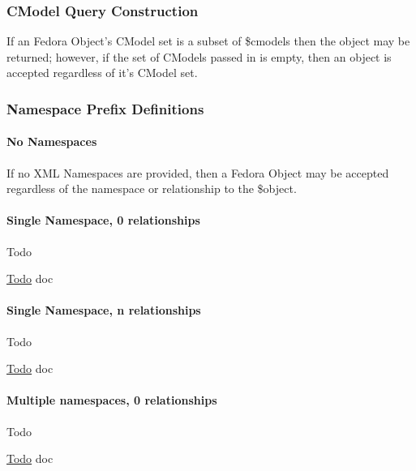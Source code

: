 \subsubsection*{C\+Model Query Construction}

If an Fedora Object's C\+Model set is a subset of \$cmodels then the object may be returned; however, if the set of C\+Models passed in is empty, then an object is accepted regardless of it's C\+Model set.

\subsubsection*{Namespace Prefix Definitions}

\paragraph*{No Namespaces}

If no X\+M\+L Namespaces are provided, then a Fedora Object may be accepted regardless of the namespace or relationship to the \$object. \paragraph*{Single Namespace, 0 relationships}

\begin{DoxyRefDesc}{Todo}
\item[\hyperlink{todo__todo000005}{Todo}]doc\end{DoxyRefDesc}


\paragraph*{Single Namespace, n relationships}

\begin{DoxyRefDesc}{Todo}
\item[\hyperlink{todo__todo000006}{Todo}]doc\end{DoxyRefDesc}


\paragraph*{Multiple namespaces, 0 relationships}

\begin{DoxyRefDesc}{Todo}
\item[\hyperlink{todo__todo000007}{Todo}]doc\end{DoxyRefDesc}


